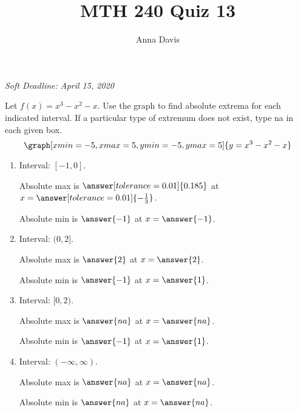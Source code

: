\documentclass{ximera}
\author{Anna Davis} \title{MTH 240 Quiz 13}
\begin{document}
\begin{abstract}

\end{abstract}
\maketitle
 \textit{Soft Deadline: April 15, 2020}
\begin{problem}\label{prob:240quiz13prob1}
Let $f(x)=x^3-x^2-x$.  Use the graph to find absolute extrema for each indicated interval.  If a particular type of extremum does not exist, type na in each given box.
\[
\graph[xmin=-5,xmax=5,ymin=-5,ymax=5]{y=x^3-x^2-x} 
\]

\begin{enumerate}
    \item Interval: $[-1, 0]$.
    
    Absolute max is $\answer[tolerance=0.01]{0.185}$ at $x=\answer[tolerance=0.01]{-\frac{1}{3}}$.
    
    Absolute min is $\answer{-1}$ at $x=\answer{-1}$.
    
    \item Interval: $(0, 2]$.
    
    Absolute max is $\answer{2}$ at $x=\answer{2}$.
    
    Absolute min is $\answer{-1}$ at $x=\answer{1}$.
    
    \item Interval: $[0, 2)$.
    
    Absolute max is $\answer{na}$ at $x=\answer{na}$.
    
    Absolute min is $\answer{-1}$ at $x=\answer{1}$.
    
    \item Interval: $(-\infty, \infty)$.
    
    Absolute max is $\answer{na}$ at $x=\answer{na}$.
    
    Absolute min is $\answer{na}$ at $x=\answer{na}$.
\end{enumerate}
\end{problem}
\end{document}
